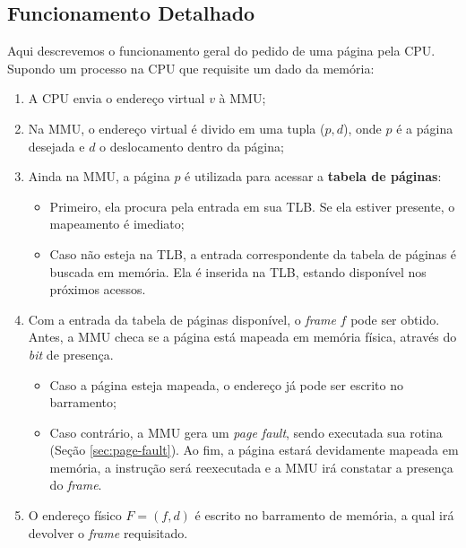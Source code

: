 \subsection{Funcionamento Detalhado}
Aqui descrevemos o funcionamento geral do pedido de uma página pela CPU. Supondo um processo na CPU que requisite um dado da memória:

\begin{enumerate}
  \item A CPU envia o endereço virtual $v$ à MMU;

  \item Na MMU, o endereço virtual é divido em uma tupla ($p,d$), onde $p$ é a página desejada e $d$ o deslocamento dentro da página;

  \item Ainda na MMU, a página $p$ é utilizada para acessar a \textbf{tabela de páginas}:
    \begin{itemize}
      \item Primeiro, ela procura pela entrada em sua TLB. Se ela estiver presente, o mapeamento é imediato;

      \item Caso não esteja na TLB, a entrada correspondente da tabela de páginas é buscada em memória. Ela é inserida na TLB, estando disponível nos próximos acessos.
    \end{itemize}

  \item Com a entrada da tabela de páginas disponível, o \textit{frame} $f$ pode ser obtido. Antes, a MMU checa se a página está mapeada em memória física, através do \textit{bit} de presença.

  \begin{itemize}
    \item Caso a página esteja mapeada, o endereço já pode ser escrito no barramento;

    \item Caso contrário, a MMU gera um \textit{page fault}, sendo executada sua rotina (Seção \ref{sec:page-fault}). Ao fim, a página estará devidamente mapeada em memória, a instrução será reexecutada e a MMU irá constatar a presença do \textit{frame}.
  \end{itemize}

  \item O endereço físico $F = (f,d)$ é escrito no barramento de memória, a qual irá devolver o \textit{frame} requisitado.
\end{enumerate}



